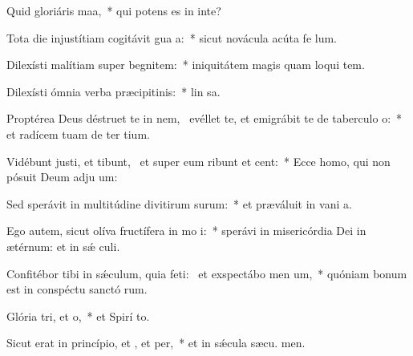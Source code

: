 \item Quid gloriáris  maa,~* qui potens es in inte?
\item Tota die injustítiam cogitávit gua a:~* sicut novácula acúta fe lum.
\item Dilexísti malítiam super begnitem:~* iniquitátem magis quam loqui tem.
\item Dilexísti ómnia verba præcipitinis:~* lin sa.
\item Proptérea Deus déstruet te in nem,~\pscross{} evéllet te, et emigrábit te de taberculo o:~* et radícem tuam de ter tium.
\item Vidébunt justi, et tibunt,~\pscross{} et super eum ribunt et cent:~* Ecce homo, qui non pósuit Deum adju um:
\item Sed sperávit in multitúdine divitirum surum:~* et præváluit in vani a.
\item Ego autem, sicut olíva fructífera in mo i:~* sperávi in misericórdia Dei in ætérnum: et in sǽ culi.
\item Confitébor tibi in sǽculum, quia feti:~\pscross{} et exspectábo men um,~* quóniam bonum est in conspéctu sanctó rum.
\item Glória tri, et o,~* et Spirí to.
\item Sicut erat in princípio, et , et per,~* et in sǽcula sæcu. men.
